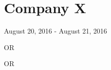 \documentclass[10pt,letterpaper]{article}
\begin{document}
\section{Company X}
August 20, 2016 - August 21, 2016

\begin{enumerate}
\end{enumerate}

OR

\begin{itemize}
\end{itemize}

OR

\begin{enumerate}
\end{enumerate}
\end{document}
